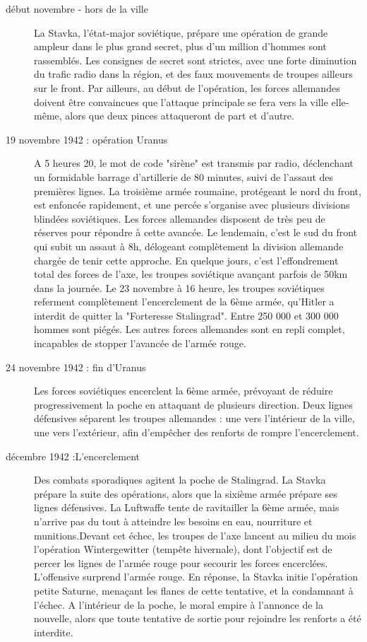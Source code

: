 \documentclass{report}
\begin{document}
\begin{multicols}{2}
\begin{description}
\item[début novembre - hors de la ville] La Stavka, l'état-major soviétique, prépare une opération de grande ampleur dans le plus grand secret, plus d'un million d'hommes sont rassemblés. Les consignes de secret sont strictes, avec une forte diminution du trafic radio dans la région, et des faux mouvements de troupes ailleurs sur le front. Par ailleurs, au début de l'opération, les forces allemandes doivent être convaincues que l'attaque principale se fera vers la ville elle-même, alors que deux pinces attaqueront de part et d'autre.
\item[19 novembre 1942 : opération Uranus] A 5 heures 20, le mot de code "sirène" est transmis par radio, déclenchant un formidable barrage d'artillerie de 80 minutes, suivi de l'assaut des premières lignes. La troisième armée roumaine, protégeant le nord du front, est enfoncée rapidement, et une percée s'organise avec plusieurs divisions blindées soviétiques. Les forces allemandes disposent de très peu de réserves pour répondre à cette avancée. Le lendemain, c'est le sud du front qui subit un assaut à 8h, délogeant complètement la division allemande chargée de tenir cette approche. En quelque jours, c'est l'effondrement total des forces de l'axe, les troupes soviétique avançant parfois de 50km dans la journée. Le 23 novembre à 16 heure, les troupes soviétiques referment complètement l'encerclement de la 6ème armée, qu'Hitler a interdit de quitter la "Forteresse Stalingrad". Entre 250 000 et 300 000 hommes sont piégés. Les autres forces allemandes sont en repli complet, incapables de stopper l'avancée de l'armée rouge.
\item[24 novembre 1942 : fin d'Uranus] Les forces soviétiques encerclent la 6ème armée, prévoyant de réduire progressivement la poche en attaquant de plusieurs direction. Deux lignes défensives séparent les troupes allemandes : une vers l'intérieur de la ville, une vers l'extérieur, afin d'empêcher des renforts de rompre l'encerclement.
\item[décembre 1942 :L'encerclement]Des combats sporadiques agitent la poche de Stalingrad. La Stavka prépare la suite des opérations, alors que la sixième armée prépare ses lignes défensives. La Luftwaffe tente de ravitailler la 6ème armée, mais n'arrive pas du tout à atteindre les besoins en eau, nourriture et munitions.Devant cet échec, les troupes de l'axe lancent au milieu du mois l'opération Wintergewitter (tempête hivernale), dont l'objectif est de percer les lignes de l'armée rouge pour secourir les forces encerclées. L'offensive surprend l'armée rouge. En réponse, la Stavka initie l'opération petite Saturne, menaçant les flancs de cette tentative, et la condamnant à l'échec. A l'intérieur de la poche, le moral empire à l'annonce de la nouvelle, alors que toute tentative de sortie pour rejoindre les renforts a été interdite.

\end{description}
\end{multicols}
\end{document}
